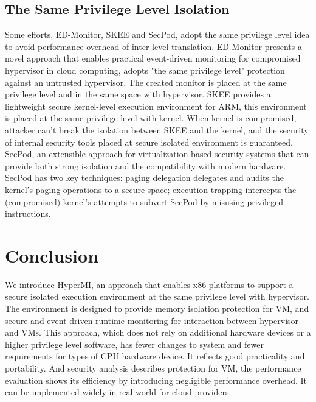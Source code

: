 \documentclass[conference]{IEEEtran}
\begin{document}
\subsection{The Same Privilege Level Isolation}
Some efforts, ED-Monitor\cite{Deng2017Dancing}, SKEE\cite{Azab2016SKEE} and SecPod\cite{Wang2015SecPod}, adopt the same privilege level idea to avoid performance overhead of inter-level translation. ED-Monitor presents a novel approach that enables practical event-driven monitoring for compromised hypervisor in cloud computing, adopts "the same privilege level" protection against an untrusted hypervisor. The created monitor is placed at the same privilege level and in the same space with hypervisor. SKEE provides a lightweight secure kernel-level execution environment for ARM, this environment is placed at the same privilege level with kernel. When kernel is compromised, attacker can't break the isolation between SKEE and the kernel, and the security of internal security tools placed at secure isolated environment is guaranteed. SecPod, an extensible approach for virtualization-based security systems that can provide both strong isolation and the compatibility with modern hardware. SecPod has two key techniques: paging delegation delegates and audits the kernel's paging operations to a secure space; execution trapping intercepts the (compromised) kernel's attempts to subvert SecPod by misusing privileged instructions.

\section{Conclusion}
We introduce HyperMI, an approach that enables x86 platforms to support a secure isolated execution environment at the same privilege level with hypervisor. The environment is designed to provide memory isolation protection for VM, and secure and event-driven runtime monitoring for interaction between hypervisor and VMs. This approach, which does not rely on additional hardware devices or a higher privilege level software, has fewer changes to system and fewer requirements for types of CPU hardware device. It reflects good practicality and portability. And security analysis describes protection for VM, the performance evaluation shows its efficiency by introducing negligible performance overhead. It can be implemented widely in real-world for cloud providers.


 

\end{document}
